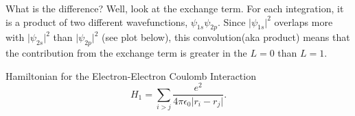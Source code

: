 \documentclass{article}
\numberwithin{equation}{section} %
\begin{document}
What is the difference? Well, look at the exchange term. For each integration, it is a product of two different wavefunctions, $\psi_{1s}\psi_{2p}$. Since $\vert\psi_{1s}\vert^2$ overlaps more with $\vert\psi_{2s}\vert^2$ than $\vert\psi_{2p}\vert^2$ (see plot below), this convolution(aka product) means that the contribution from the exchange term is greater in the $L=0$ than $L=1$. 




\begin{tcolorbox}[colback=pink]
Hamiltonian for the Electron-Electron Coulomb Interaction
\begin{equation}
H_1=\sum_{i>j} \frac{e^2}{4\pi\epsilon_0\vert r_i-r_j\vert}.
\end{equation}
\end{tcolorbox}



\newpage

\end{document}
